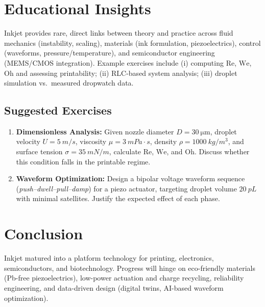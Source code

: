 \documentclass[conference]{IEEEtran}
\newcommand{\Oh}{\mathrm{Oh}}
\newcommand{\We}{\mathrm{We}}
\newcommand{\Rey}{\mathrm{Re}}
\begin{document}
\section{Educational Insights}
Inkjet provides rare, direct links between theory and practice across fluid mechanics (instability, scaling), materials (ink formulation, piezoelectrics), control (waveforms, pressure/temperature), and semiconductor engineering (MEMS/CMOS integration). Example exercises include (i) computing $\Rey$, $\We$, $\Oh$ and assessing printability; (ii) RLC-based system analysis; (iii) droplet simulation vs.\ measured dropwatch data.

\subsection*{Suggested Exercises}
\begin{enumerate}
  \item \textbf{Dimensionless Analysis:}  
  Given nozzle diameter $D=\SI{30}{\micro\meter}$, droplet velocity $U=\SI{5}{m/s}$, viscosity $\mu=\SI{3}{mPa\cdot s}$, density $\rho=\SI{1000}{kg/m^3}$, and surface tension $\sigma=\SI{35}{mN/m}$, calculate $\Rey$, $\We$, and $\Oh$. Discuss whether this condition falls in the printable regime.
  
  \item \textbf{Waveform Optimization:}  
  Design a bipolar voltage waveform sequence (\emph{push--dwell--pull--damp}) for a piezo actuator, targeting droplet volume $\SI{20}{pL}$ with minimal satellites. Justify the expected effect of each phase.
\end{enumerate}

\section{Conclusion}
Inkjet matured into a platform technology for printing, electronics, semiconductors, and biotechnology. Progress will hinge on eco-friendly materials (Pb-free piezoelectrics), low-power actuation and charge recycling, reliability engineering, and data-driven design (digital twins, AI-based waveform optimization).
\end{document}
